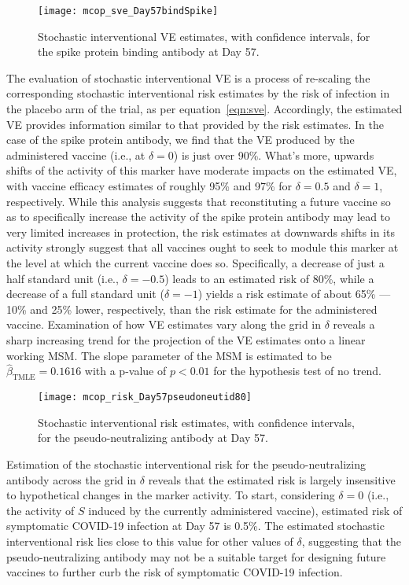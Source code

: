 \begin{figure}[H]
  \centering
  \texttt{[image: mcop\_sve\_Day57bindSpike]}
  \caption{Stochastic interventional VE estimates, with confidence intervals,
    for the spike protein binding antibody at Day 57.}
  \label{fig:marker1-sve-day57}
\end{figure}

The evaluation of stochastic interventional VE is a process of re-scaling the
corresponding stochastic interventional risk estimates by the risk of infection
in the placebo arm of the trial, as per equation~\ref{eqn:sve}. Accordingly, the
estimated VE provides information similar to that provided by the risk
estimates. In the case of the spike protein antibody, we find that the VE
produced by the administered vaccine (i.e., at $\delta = 0$) is just over 90\%.
What's more, upwards shifts of the activity of this marker have moderate impacts
on the estimated VE, with vaccine efficacy estimates of roughly 95\% and 97\%
for $\delta = 0.5$ and $\delta = 1$, respectively. While this analysis suggests
that reconstituting a future vaccine so as to specifically increase the activity
of the spike protein antibody may lead to very limited increases in protection,
the risk estimates at downwards shifts in its activity strongly suggest that all
vaccines ought to seek to module this marker at the level at which the current
vaccine does so. Specifically, a decrease of just a half standard unit (i.e.,
$\delta = -0.5$) leads to an estimated risk of 80\%, while a decrease of a full
standard unit ($\delta = -1$) yields a risk estimate of about 65\% --- 10\% and
25\% lower, respectively, than the risk estimate for the administered vaccine.
Examination of how VE estimates vary along the grid in $\delta$ reveals a sharp
increasing trend for the projection of the VE estimates onto a linear working
MSM. The slope parameter of the MSM is estimated to be
$\hat{\beta}_{\text{TMLE}} = 0.1616$ with a p-value of $p < 0.01$ for the
hypothesis test of no trend.

\begin{figure}[H]
  \centering
  \texttt{[image: mcop\_risk\_Day57pseudoneutid80]}
  \caption{Stochastic interventional risk estimates, with confidence intervals,
  for the pseudo-neutralizing antibody at Day 57.}
  \label{fig:marker4-risk-day57}
\end{figure}

Estimation of the stochastic interventional risk for the pseudo-neutralizing
antibody across the grid in $\delta$ reveals that the estimated risk is largely
insensitive to hypothetical changes in the marker activity. To start,
considering $\delta = 0$ (i.e., the activity of $S$ induced by the currently
administered vaccine), estimated risk of symptomatic COVID-19 infection at Day
57 is 0.5\%. The estimated stochastic interventional risk lies close to this
value for other values of $\delta$, suggesting that the pseudo-neutralizing
antibody may not be a suitable target for designing future vaccines to further
curb the risk of symptomatic COVID-19 infection.

